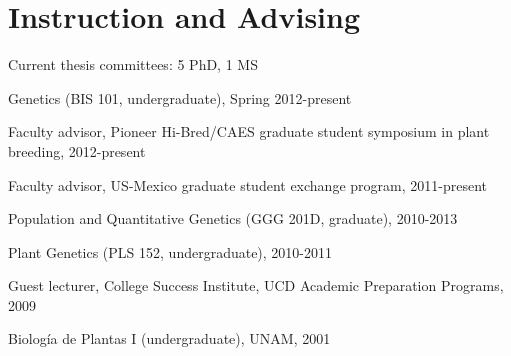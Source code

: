 \documentclass[letterpaper]{article}
\renewenvironment{itemize}{
  \begin{list}{}{
    \setlength{\leftmargin}{1.5em}
  }
}{
  \end{list}
}
\begin{document}
\section*{Instruction and Advising}
\begin{itemize}
\item Current thesis committees: 5 PhD, 1 MS
\item Genetics (BIS 101, undergraduate), Spring 2012-present
\item Faculty advisor, Pioneer Hi-Bred/CAES graduate student symposium in plant breeding, 2012-present
\item Faculty advisor, US-Mexico graduate student exchange program, 2011-present
\item Population and Quantitative Genetics (GGG 201D, graduate), 2010-2013 %
\item Plant Genetics (PLS 152, undergraduate), 2010-2011 %
\item Guest lecturer, College Success Institute, UCD Academic Preparation Programs, 2009
\item Biolog\'{i}a de Plantas I (undergraduate), UNAM, 2001
\end{itemize}
\end{document}
